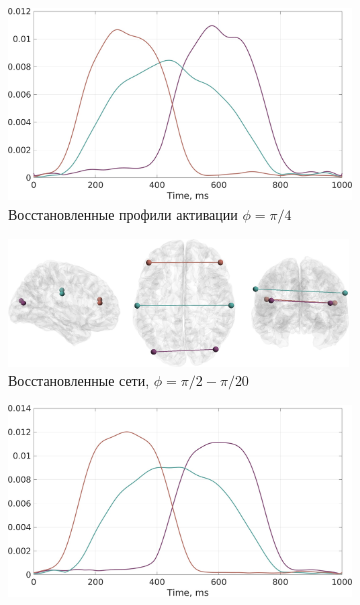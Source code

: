 \begin{figure}[htbp]
\begin{subfigure}[t]{0.6\textwidth}
    \end{subfigure}
    \begin{subfigure}[t]{0.4\textwidth}
        \includegraphics[width=0.99\linewidth]{../images/timeseries_gopsiicos_pi4.jpg}
        \caption{Восстановленные профили активации $\phi=\pi/4$}\label{fig:gopsiicos_d}
    \end{subfigure}
    \begin{subfigure}[t]{0.6\textwidth}
        \includegraphics[width=0.99\textwidth]{../images/networks_gopsiicos_pi2pi20.jpg}
        \caption{Восстановленные сети, $\phi=\pi/2-\pi/20$}\label{fig:gopsiicos_e}
    \end{subfigure}
    \begin{subfigure}[t]{0.4\textwidth}
        \includegraphics[width=0.99\linewidth]{../images/timeseries_gopsiicos_pi2pi20.jpg}

\end{subfigure}
\end{figure}
